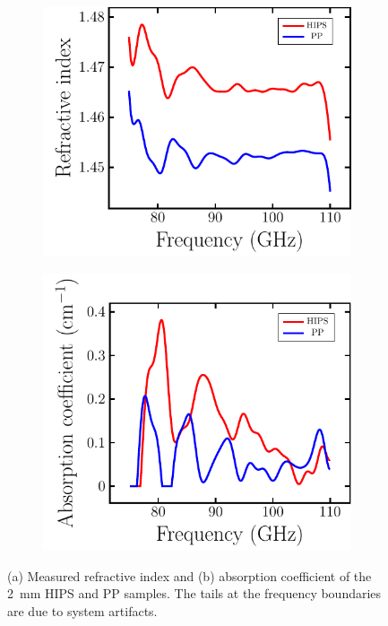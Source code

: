 \begin{figure}[H]
    \begin{subfigure}[b]{.5\linewidth}
    \caption{}\label{}
    \centering\includegraphics[scale=0.7]{images/results/plots/polymer/HIPS_PP_ri_a.pdf}
    \end{subfigure}%
    \begin{subfigure}[b]{.5\linewidth}
    \caption{}\label{}
    \centering\includegraphics[scale=0.7]{images/results/plots/polymer/HIPS_PP_ri_b.pdf}
    \end{subfigure}
    \caption{(a) Measured refractive index and (b) absorption coefficient of the \SI{2}{\milli \meter} HIPS and PP samples. The tails at the frequency boundaries are due to system artifacts.}
    \label{fig:HIPS_PP_ri}
\end{figure}

